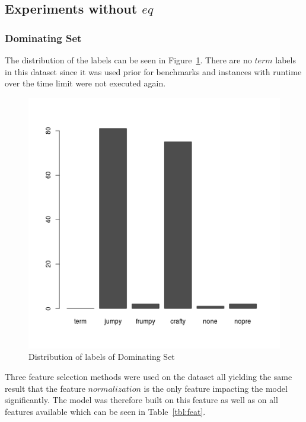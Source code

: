 \subsection{Experiments without \inline$eq$}
\subsubsection{Dominating Set}
The distribution of the labels can be seen in Figure~\ref{fig:dsLabelsE1}. There are no \inline$term$ labels in this dataset since it was used prior for benchmarks and instances with runtime over the time limit were not executed again.
\begin{figure}[h]
	\center
	\includegraphics[scale=\figscale]{figures/domsetLabelsE1.png}
	\caption{Distribution of labels of Dominating Set\label{fig:dsLabelsE1}}
\end{figure}
\par Three feature selection methods were used on the dataset all yielding the same result that the feature \inline$normalization$ is the only feature impacting the model significantly. The model was therefore built on this feature as well as on all features available which can be seen in Table~\ref{tbl:feat}.

